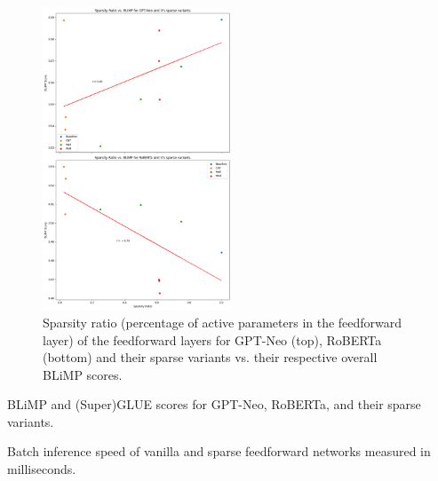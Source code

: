 \begin{figure}[!h]
    \centering
    \includegraphics[width=0.5\textwidth]{sparsity_ratio.png}
    \caption{Sparsity ratio (percentage of active parameters in the feedforward layer) of the feedforward layers for GPT-Neo (top), RoBERTa (bottom) and their sparse variants vs. their respective overall BLiMP scores.}
    \label{fig:spar-rat}
\end{figure}

\begin{table}[h]
    \caption{BLiMP and (Super)GLUE scores for GPT-Neo, RoBERTa, and their sparse variants.}
    \label{tab:summary_eval}
    \centering
    \tiny
    
\end{table}

\begin{table}[h]
    \caption{Batch inference speed of vanilla and sparse feedforward networks measured in milliseconds.}
    \label{tab:inference}
    \centering
    
\end{table}
